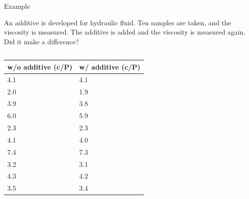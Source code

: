 \begin{frame}{Example}

  An additive is developed for hydraulic fluid. Ten samples are taken,
  and the viscosity is measured. The additive is added and the
  viscosity is measured again. Did it make a difference?

  \begin{columns}

    \begin{tabular}{ll}
      w/o additive (c/P) & w/ additive (c/P)  \\\hline
      4.1 & 4.1 \\
      2.0 & 1.9 \\
      3.9 & 3.8 \\
      6.0 & 5.9 \\
      2.3 & 2.3 \\
      4.1 & 4.0 \\
      7.4 & 7.3 \\
      3.2 & 3.1 \\
      4.3 & 4.2 \\
      3.5 & 3.4
    \end{tabular}



  \end{columns}
  
\end{frame}

